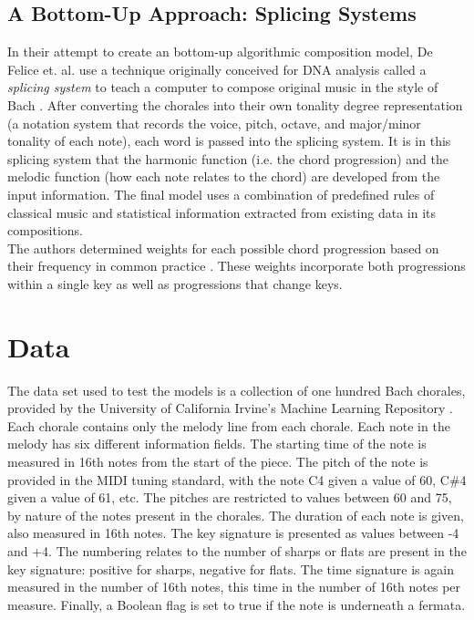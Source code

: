 \documentclass[12pt]{article}
\begin{document}
\subsection{A Bottom-Up Approach: Splicing Systems}
In their attempt to create an bottom-up algorithmic composition model, De Felice et. al. use a technique originally conceived for DNA analysis called a {\it splicing system} to teach a computer to compose original music in the style of Bach \cite{computer_composer}. After converting the chorales into their own tonality degree representation (a notation system that records the voice, pitch, octave, and major/minor tonality of each note), each word is passed into the splicing system. It is in this splicing system that the harmonic function (i.e. the chord progression) and the melodic function (how each note relates to the chord) are developed from the input information. The final model uses a combination of predefined rules of classical music and statistical information extracted from existing data in its compositions.\\

The authors determined weights for each possible chord progression based on their frequency in common practice \cite{computer_composer}. These weights incorporate both progressions within a single key as well as progressions that change keys. 

\section{Data}
The data set used to test the models is a collection of one hundred Bach chorales, provided by the University of California Irvine's Machine Learning Repository \cite{data_set}. Each chorale contains only the melody line from each chorale. Each note in the melody has six different information fields. The starting time of the note is measured in 16th notes from the start of the piece. The pitch of the note is provided in the MIDI tuning standard, with the note C4 given a value of 60, C\#4 given a value of 61, etc. The pitches are restricted to values between 60 and 75, by nature of the notes present in the chorales. The duration of each note is given, also measured in 16th notes. The key signature is presented as values between -4 and +4. The numbering relates to the number of sharps or flats are present in the key signature: positive for sharps, negative for flats. The time signature is again measured in the number of 16th notes, this time in the number of 16th notes per measure. Finally, a Boolean flag is set to true if the note is underneath a fermata.
\end{document}
